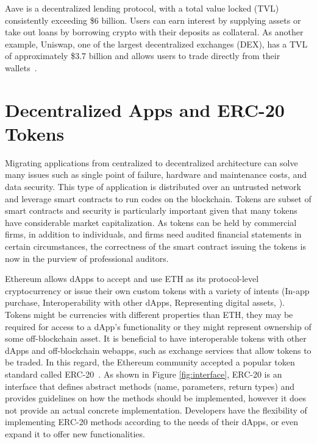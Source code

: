 \begin{example}
	Aave is a decentralized lending protocol, with a total value locked (TVL) consistently exceeding \$6 billion. Users can earn interest by supplying assets or take out loans by borrowing crypto with their deposits as collateral. As another example, Uniswap, one of the largest decentralized exchanges (DEX), has a TVL of approximately \$3.7 billion and allows users to trade directly from their wallets~\cite{theblock2024}.
\end{example}

\section{Decentralized Apps and ERC-20 Tokens}
Migrating applications from centralized to decentralized architecture can solve many issues such as single point of failure, hardware and maintenance costs, and data security. This type of application is distributed over an untrusted network and leverage smart contracts to run codes on the blockchain. Tokens are subset of smart contracts and security is particularly important given that many tokens have considerable market capitalization. As tokens can be held by commercial firms, in addition to individuals, and firms need audited financial statements in certain circumstances, the correctness of the smart contract issuing the tokens is now in the purview of professional auditors.

Ethereum allows dApps to accept and use ETH as its protocol-level cryptocurrency or issue their own custom tokens with a variety of intents (\eg In-app purchase, Interoperability with other dApps, Representing digital assets, \etc). Tokens might be currencies with different properties than ETH, they may be required for access to a dApp's functionality or they might represent ownership of some off-blockchain asset. It is beneficial to have interoperable tokens with other dApps and off-blockchain webapps, such as exchange services that allow tokens to be traded. In this regard, the Ethereum community accepted a popular token standard called ERC-20~\cite{Interface}. As shown in Figure \ref{fig:interface}, ERC-20 is an interface that defines abstract methods (name, parameters, return types) and provides guidelines on how the methods should be implemented, however it does not provide an actual concrete implementation. Developers have the flexibility of implementing ERC-20 methods according to the needs of their dApps, or even expand it to offer new functionalities.

